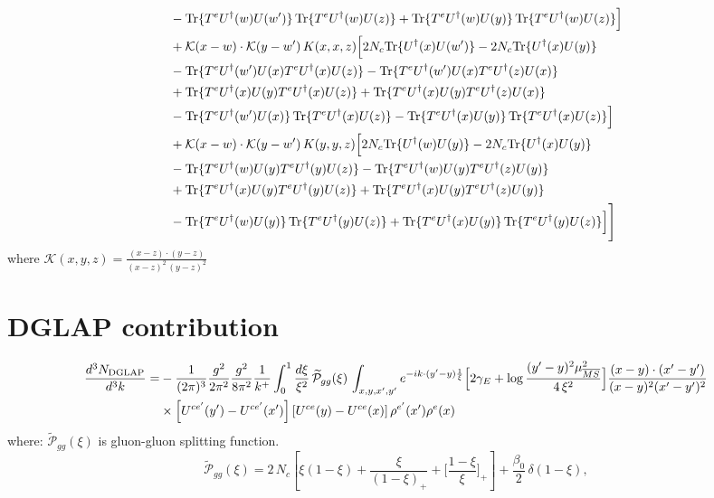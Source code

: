 \documentclass[9pt]{article}
\numberwithin{equation}{section}
\begin{document}
\begin{align}
&-{\rm Tr}\{T^eU^\dagger(w)U(w')\}\,{\rm Tr}\{T^eU^\dagger(w)U(z)\}+{\rm Tr}\{T^eU^\dagger(w)U(y)\}\,{\rm Tr}\{T^eU^\dagger(w)U(z)\}\Big]\notag\\
&+\mathcal K(x-w)\cdot\mathcal K(y-w')\,K(x,x,z)\Big[2 N_{c}{\rm Tr}\{U^\dagger(x)U(w')\}-2 N_{c}{\rm Tr}\{U^\dagger(x)U(y)\}\notag\\
&-{\rm Tr}\{T^eU^\dagger(w')U(x)T^eU^\dagger(x)U(z)\}-{\rm Tr}\{T^eU^\dagger(w')U(x)T^eU^\dagger(z)U(x)\}\notag\\
&+{\rm Tr}\{T^eU^\dagger(x)U(y)T^eU^\dagger(x)U(z)\}+{\rm Tr}\{T^eU^\dagger(x)U(y)T^eU^\dagger(z)U(x)\}\notag\\
&-{\rm Tr}\{T^eU^\dagger(w')U(x)\}\,{\rm Tr}\{T^eU^\dagger(x)U(z)\}-{\rm Tr}\{T^eU^\dagger(x)U(y)\}\,{\rm Tr}\{T^eU^\dagger(x)U(z)\}\Big]\notag\\
&+\mathcal K(x-w)\cdot\mathcal K(y-w')\,K(y,y,z)\Big[2 N_{c}{\rm Tr}\{U^\dagger(w)U(y)\}-2 N_{c}{\rm Tr}\{U^\dagger(x)U(y)\}\notag\\
&-{\rm Tr}\{T^eU^\dagger(w)U(y)T^eU^\dagger(y)U(z)\}-{\rm Tr}\{T^eU^\dagger(w)U(y)T^eU^\dagger(z)U(y)\}\notag\\
&+{\rm Tr}\{T^eU^\dagger(x)U(y)T^eU^\dagger(y)U(z)\}+{\rm Tr}\{T^eU^\dagger(x)U(y)T^eU^\dagger(z)U(y)\}\notag\\
&-{\rm Tr}\{T^eU^\dagger(w)U(y)\}\,{\rm Tr}\{T^eU^\dagger(y)U(z)\}+{\rm Tr}\{T^eU^\dagger(x)U(y)\}\,{\rm Tr}\{T^eU^\dagger(y)U(z)\}\Big]\Bigg]
\end{align}
where $\mathcal{K}(x,y,z) = \frac{(x-z)\cdot (y-z)}{(x-z)^{2}\,(y-z)^{2}}$
\section{DGLAP contribution}
\begin{align}
\frac{d^{3}N_{\rm DGLAP}}{d^{3}k}= &-\frac{1}{(2\pi)^{3}}\frac{g^{2}}{2\pi^{2}}\frac{g^{2}}{8\pi^{2}}\frac{1}{k^{+}}\int_{0}^{1}\frac{d\xi}{\xi^{2}}\,\widetilde{\mathcal P}_{gg}(\xi)\,\int_{x,y,x',y'}e^{-ik\cdot(y'-y)\frac{1}{\xi}}\Big[2\gamma_{E}+\log\frac{(y'-y)^{2}\mu^{2}_{\overline{MS}}}{4\,\xi^{2}}\Big]\frac{(x-y)\cdot(x'-y')}{(x-y)^{2}(x'-y')^{2}}\notag\\
&\times\left[U^{ce'}(y') - U^{ce'}(x')\right]\left[U^{ce}(y) - U^{ce}(x)\right]\rho^{e'}(x')\rho^{e}(x)
\end{align}
where:
$\widetilde{\mathcal{P}}_{gg}(\xi)$ is gluon-gluon splitting function.
$$\widetilde{\mathcal{P}}_{gg}(\xi) = 2\,N_{c}\left[\xi(1-\xi) + \frac{\xi}{(1-\xi)_{+}} + \Big[\frac{1-\xi}{\xi}\Big]_{+}\right]+\frac{\beta_{0}}{2}\,\delta(1-\xi),$$
\end{document}
